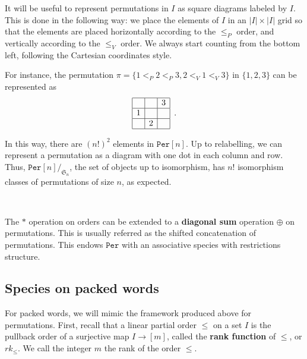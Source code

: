 \documentclass[12pt, reqno]{amsart}
\theoremstyle{definition}
\begin{document}
It will be useful to represent permutations in $I$ as square diagrams labeled by $I$.
This is done in the following way: we place the elements of $I$ in an $|I| \times |I|$ grid so that the elements are placed horizontally according to the $\leq_P$ order, and vertically according to the $\leq_V$ order.
We always start counting from the bottom left, following the Cartesian coordinates style.

For instance, the permutation $\pi = \{1<_P2<_P3 , 2<_V1<_V3\}$ in $\{1, 2, 3\}$ can be represented as 
\begin{equation}
\begin{array}{|c|c|c|}
	\hline & & 3 \\
    \hline 1 & &  \\
    \hline & 2 & \\
    \hline 
\end{array}\, \, \, .
\end{equation}

In this way, there are $(n!)^2 $ elements in $\mathtt{Per}[n]$.
Up to relabelling, we can represent a permutation as a diagram with one dot in each column and row.
Thus, $\mathtt{Per}[n]/_{\mathfrak S_n}$, the set of objects up to isomorphism, has $n!$ isomorphism classes of permutations of size $n$, as expected.
\


\

The $\ast $ operation on orders can be extended to a \textbf{diagonal sum} operation $\oplus $ on permutations.
This is usually referred as the shifted concatenation of permutations.
This endows $\mathtt{Per}$ with an  associative species with restrictions structure.



\subsection{Species on packed words}


For packed words, we will mimic the framework produced above for permutations.
First, recall that a linear partial order $\leq$ on a set $I$ is the pullback order of a surjective map $I \to [m]$, called the \textbf{rank function} of $\leq$, or $rk_{\leq}$.
We call the integer $m$ the rank of the order $\leq$.
\end{document}
